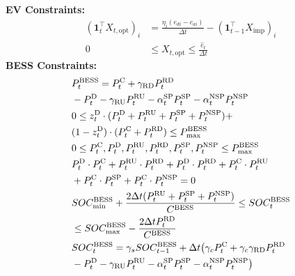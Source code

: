 \documentclass[conference]{IEEEtran}
\begin{document}
\textbf{EV Constraints:}
\begin{align}
    (\mathbf{1}_t^\top X_{t,\text{opt}})_i &= \frac{\eta_i (e_{di} - e_{ai})}{\Delta{t}} - (\mathbf{1}_{t-1}^\top X_{\text{imp}})_i \label{eq:EV_dynamic} \\
%    
    0 &\leq X_{t,\text{opt}} \leq \frac{\hat{e}_t}{\Delta{t}} \label{eq:EV_physical}
\end{align}
%
\textbf{BESS Constraints:}
\begin{align}
    &P^{\text{BESS}}_t = P^{\text{C}}_{t} + \gamma_{{\text{RD}}} P^{{\text{RD}}}_t \notag \\
    &- P^{\text{D}}_{t} - \gamma_{{\text{RU}}} P^{{\text{RU}}}_t - \alpha^{{\text{SP}}}_t P^{{\text{SP}}}_t - \alpha^{{\text{NSP}}}_t P^{{\text{NSP}}}_t \label{eq:BESS_load} \\
%    
    &0 \leq z^{\text{D}}_t \cdot (P^{\text{D}}_{t} + P^{{\text{RU}}}_t + P^{{\text{SP}}}_t + P^{{\text{NSP}}}_t) + \notag \\
    &(1-z^{\text{D}}_t) \cdot (P^{\text{C}}_{t} + P^{{\text{RD}}}_t) \leq P^{\text{BESS}}_{\text{max}} \label{eq:BESS_physical} \\
%    
    &0 \leq P^{\text{C}}_t, P^{\text{D}}_t, P^{{\text{RU}}}_t, P^{{\text{RD}}}_t, P^{{\text{SP}}}_t, P^{{\text{NSP}}}_t \leq P^{\text{BESS}}_{\text{max}} \label{eq:BESS_physical2} \\
    &P^\text{D}_t \cdot P^{\text{C}}_t + P^{{\text{RU}}}_t \cdot P^{{\text{RD}}}_t + P^\text{D}_t \cdot P^{{\text{RD}}}_t + P^{\text{C}}_t \cdot P^{{\text{RU}}}_t \notag \\
    &+ P^{\text{C}}_t \cdot P^{{\text{SP}}}_t + P^{\text{C}}_t \cdot P^{{\text{NSP}}}_t = 0 \label{eq:bess_dir} \\
    &SOC^{\text{BESS}}_{\text{min}} + \frac{2 \Delta{t} (P^{{\text{RU}}}_t + P^{{\text{SP}}}_t + P^{{\text{NSP}}}_t)}{C^{\text{BESS}}} \leq SOC^{\text{BESS}}_t \notag \\
    &\leq SOC^{\text{BESS}}_{\text{max}} - \frac{2 \Delta{t} P^{{\text{RD}}}_t}{C^{\text{BESS}}} \label{eq:SOC_physical} \\ 
    &SOC^{\text{BESS}}_t = \gamma_s SOC^{\text{BESS}}_{t-1} + \Delta{t} \big( \gamma_c P^{\text{C}}_{t} + \gamma_c \gamma_{{\text{RD}}} P^{{\text{RD}}}_t \notag \\
    &- P^{\text{D}}_{t} - \gamma_{{\text{RU}}} P^{{\text{RU}}}_t - \alpha^{{\text{SP}}}_t P^{{\text{SP}}}_t - \alpha^{{\text{NSP}}}_t P^{{\text{NSP}}}_t \big) \label{eq:SOC_dynamic} \\

\end{align}
\end{document}
